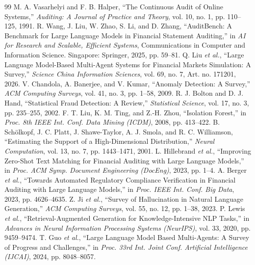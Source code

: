 \documentclass[9pt,a4paper,twocolumn]{extarticle}
\begin{document}
\renewcommand{\refname}{References}
\begin{thebibliography}{99}
\fontsize{9}{10.5}\selectfont\setlength{\itemsep}{0pt}
 M. A. Vasarhelyi and F. B. Halper, ``The Continuous Audit of Online Systems,'' \textit{Auditing: A Journal of Practice and Theory}, vol. 10, no. 1, pp. 110--125, 1991.
 R. Wang, J. Liu, W. Zhao, S. Li, and D. Zhang, ``AuditBench: A Benchmark for Large Language Models in Financial Statement Auditing,'' in \textit{AI for Research and Scalable, Efficient Systems}, Communications in Computer and Information Science. Singapore: Springer, 2025, pp. 59--81.
 Q. Liu \textit{et al.}, ``Large Language Model-Based Multi-Agent Systems for Financial Markets Simulation: A Survey,'' \textit{Science China Information Sciences}, vol. 69, no. 7, Art. no. 171201, 2026.
 V. Chandola, A. Banerjee, and V. Kumar, ``Anomaly Detection: A Survey,'' \textit{ACM Computing Surveys}, vol. 41, no. 3, pp. 1--58, 2009.
 R. J. Bolton and D. J. Hand, ``Statistical Fraud Detection: A Review,'' \textit{Statistical Science}, vol. 17, no. 3, pp. 235--255, 2002.
 F. T. Liu, K. M. Ting, and Z.-H. Zhou, ``Isolation Forest,'' in \textit{Proc. 8th IEEE Int. Conf. Data Mining (ICDM)}, 2008, pp. 413--422.
 B. Sch\"{o}lkopf, J. C. Platt, J. Shawe-Taylor, A. J. Smola, and R. C. Williamson, ``Estimating the Support of a High-Dimensional Distribution,'' \textit{Neural Computation}, vol. 13, no. 7, pp. 1443--1471, 2001.
 L. Hillebrand \textit{et al.}, ``Improving Zero-Shot Text Matching for Financial Auditing with Large Language Models,'' in \textit{Proc. ACM Symp. Document Engineering (DocEng)}, 2023, pp. 1--4.
 A. Berger \textit{et al.}, ``Towards Automated Regulatory Compliance Verification in Financial Auditing with Large Language Models,'' in \textit{Proc. IEEE Int. Conf. Big Data}, 2023, pp. 4626--4635.
 Z. Ji \textit{et al.}, ``Survey of Hallucination in Natural Language Generation,'' \textit{ACM Computing Surveys}, vol. 55, no. 12, pp. 1--38, 2023.
 P. Lewis \textit{et al.}, ``Retrieval-Augmented Generation for Knowledge-Intensive NLP Tasks,'' in \textit{Advances in Neural Information Processing Systems (NeurIPS)}, vol. 33, 2020, pp. 9459--9474.
 T. Guo \textit{et al.}, ``Large Language Model Based Multi-Agents: A Survey of Progress and Challenges,'' in \textit{Proc. 33rd Int. Joint Conf. Artificial Intelligence (IJCAI)}, 2024, pp. 8048--8057.

\end{thebibliography}
\end{document}
